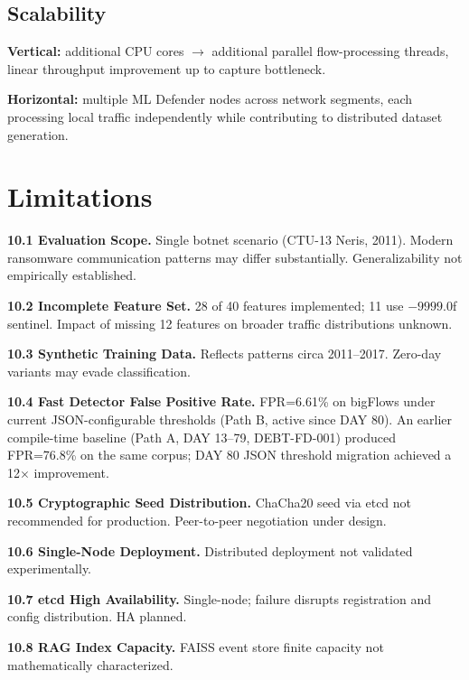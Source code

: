 \documentclass[11pt,a4paper]{article}
\begin{document}
    \subsection{Scalability}

    \textbf{Vertical:} additional CPU cores $\to$ additional parallel flow-processing threads,
    linear throughput improvement up to capture bottleneck.

    \textbf{Horizontal:} multiple ML Defender nodes across network segments, each processing
    local traffic independently while contributing to distributed dataset generation.

    \section{Limitations}
    \label{sec:limitations}

    \textbf{10.1 Evaluation Scope.} Single botnet scenario (CTU-13 Neris, 2011). Modern
    ransomware communication patterns may differ substantially. Generalizability not empirically
    established.

    \textbf{10.2 Incomplete Feature Set.} 28 of 40 features implemented; 11 use $-9999.0$f
    sentinel. Impact of missing 12 features on broader traffic distributions unknown.

    \textbf{10.3 Synthetic Training Data.} Reflects patterns circa 2011--2017. Zero-day
    variants may evade classification.

    \textbf{10.4 Fast Detector False Positive Rate.} FPR=6.61\% on bigFlows under current
    JSON-configurable thresholds (Path B, active since DAY 80). An earlier compile-time baseline
    (Path A, DAY 13--79, DEBT-FD-001) produced FPR=76.8\% on the same corpus; DAY 80 JSON
    threshold migration achieved a 12$\times$ improvement.

    \textbf{10.5 Cryptographic Seed Distribution.} ChaCha20 seed via etcd not recommended for
    production. Peer-to-peer negotiation under design.

    \textbf{10.6 Single-Node Deployment.} Distributed deployment not validated
    experimentally.

    \textbf{10.7 etcd High Availability.} Single-node; failure disrupts registration and config
    distribution. HA planned.

    \textbf{10.8 RAG Index Capacity.} FAISS event store finite capacity not mathematically
    characterized.
\end{document}

